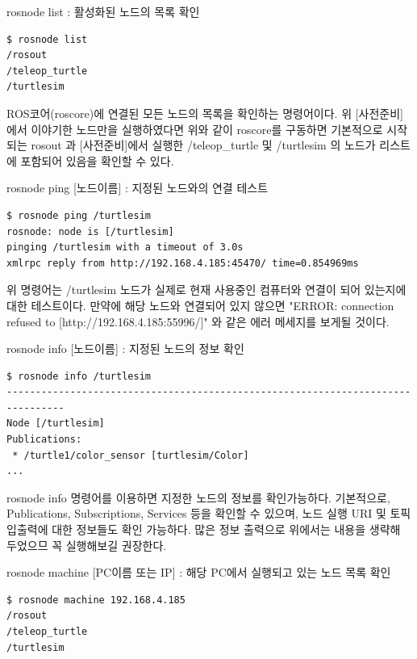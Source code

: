 \setcounter{num}{0}

\vspace{\baselineskip}
\noindent
{}\circled{\thenum} rosnode list : 활성화된 노드의 목록 확인
\begin{lstlisting}[language=ROS]
$ rosnode list
/rosout
/teleop_turtle
/turtlesim
\end{lstlisting}

\vspace{\baselineskip}
\noindent
ROS코어(roscore)에 연결된 모든 노드의 목록을 확인하는 명령어이다. 위 [사전준비] 에서 이야기한 노드만을 실행하였다면 위와 같이 roscore를 구동하면 기본적으로 시작되는 rosout 과 [사전준비]에서 실행한 /teleop\_turtle 및 /turtlesim 의 노드가 리스트에 포함되어 있음을 확인할 수 있다.

\vspace{\baselineskip}
\noindent
{}\circled{\thenum} rosnode ping [노드이름] : 지정된 노드와의 연결 테스트
\begin{lstlisting}[language=ROS]
$ rosnode ping /turtlesim
rosnode: node is [/turtlesim]
pinging /turtlesim with a timeout of 3.0s
xmlrpc reply from http://192.168.4.185:45470/ time=0.854969ms
\end{lstlisting}

\vspace{\baselineskip}
\noindent
위 명령어는 /turtlesim 노드가 실제로 현재 사용중인 컴퓨터와 연결이 되어 있는지에 대한 테스트이다. 만약에 해당 노드와 연결되어 있지 않으면 "ERROR: connection refused to [http://192.168.4.185:55996/]" 와 같은 에러 메세지를 보게될 것이다.

\vspace{\baselineskip}
\noindent
{}\circled{\thenum} rosnode info [노드이름] : 지정된 노드의 정보 확인
\begin{lstlisting}[language=ROS]
$ rosnode info /turtlesim 
--------------------------------------------------------------------------------
Node [/turtlesim]
Publications: 
 * /turtle1/color_sensor [turtlesim/Color]
...
\end{lstlisting}

\vspace{\baselineskip}
\noindent
rosnode info 명령어를 이용하면 지정한 노드의 정보를 확인가능하다. 기본적으로, Publications, Subscriptions, Services 등을 확인할 수 있으며, 노드 실행 URI 및 토픽 입출력에 대한 정보들도 확인 가능하다. 많은 정보 출력으로 위에서는 내용을 생략해 두었으므 꼭 실행해보길 권장한다.

\vspace{\baselineskip}
\noindent
{}\circled{\thenum} rosnode machine [PC이름 또는 IP] : 해당 PC에서 실행되고 있는 노드 목록 확인
\begin{lstlisting}[language=ROS]
$ rosnode machine 192.168.4.185
/rosout
/teleop_turtle
/turtlesim
\end{lstlisting}

